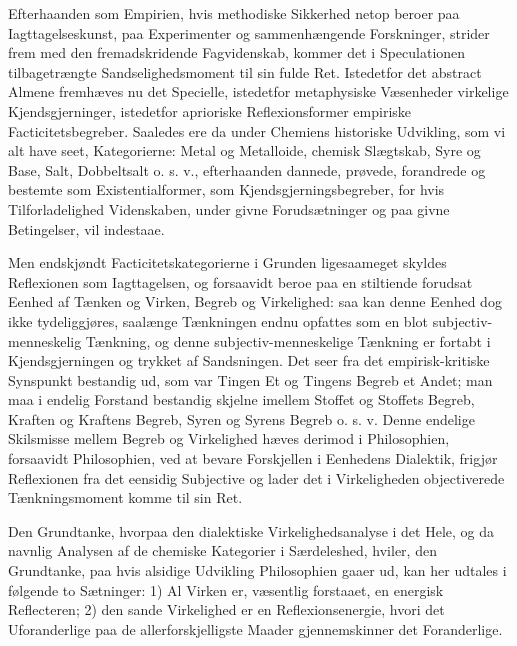 \documentclass[12pt,a4paper]{book}
\begin{document}
Efterhaanden som Empirien, hvis methodiske Sikkerhed
netop beroer paa Iagttagelseskunst, paa Experimenter og
sammenhængende Forskninger, strider frem med den
fremadskridende Fagvidenskab, kommer det i Speculationen
tilbagetrængte Sandselighedsmoment til sin fulde Ret. Istedetfor
det abstract Almene fremhæves nu det Specielle, istedetfor
metaphysiske Væsenheder virkelige Kjendsgjerninger, istedetfor
aprioriske Reflexionsformer empiriske Facticitetsbegreber.
Saaledes ere da under Chemiens historiske Udvikling, som vi alt
have seet, Kategorierne: Metal og Metalloide, chemisk
Slægtskab, Syre og Base, Salt, Dobbeltsalt o. s. v., efterhaanden
dannede, prøvede, forandrede og bestemte som Existentialformer,
som Kjendsgjerningsbegreber, for hvis Tilforladelighed
Videnskaben, under givne Forudsætninger og paa givne Betingelser,
vil indestaae.

Men endskjøndt Facticitetskategorierne i Grunden
ligesaameget skyldes Reflexionen som Iagttagelsen, og forsaavidt
beroe paa en stiltiende forudsat Eenhed af Tænken og Virken,
Begreb og Virkelighed: saa kan denne Eenhed dog ikke
tydeliggjøres, saalænge Tænkningen endnu opfattes som en blot
subjectiv-menneskelig Tænkning, og denne subjectiv-menneskelige
Tænkning er fortabt i Kjendsgjerningen og trykket af
Sandsningen. Det seer fra det empirisk-kritiske Synspunkt
bestandig ud, som var Tingen Et og Tingens Begreb et
Andet; man maa i endelig Forstand bestandig skjelne imellem
Stoffet og Stoffets Begreb, Kraften og Kraftens Begreb,
Syren og Syrens Begreb o. s. v. Denne endelige Skilsmisse
mellem Begreb og Virkelighed hæves derimod i Philosophien,
forsaavidt Philosophien, ved at bevare Forskjellen i Eenhedens
Dialektik, frigjør Reflexionen fra det eensidig Subjective og
lader det i Virkeligheden objectiverede Tænkningsmoment
komme til sin Ret.

Den Grundtanke, hvorpaa den dialektiske
Virkelighedsanalyse i det Hele, og da navnlig Analysen af de chemiske
Kategorier i Særdeleshed, hviler, den Grundtanke, paa hvis
alsidige Udvikling Philosophien gaaer ud, kan her udtales i
følgende to Sætninger: 1) Al Virken er, væsentlig forstaaet,
en energisk Reflecteren; 2) den sande Virkelighed er en
Reflexionsenergie, hvori det Uforanderlige paa de allerforskjelligste
Maader gjennemskinner det Foranderlige.
\end{document}
